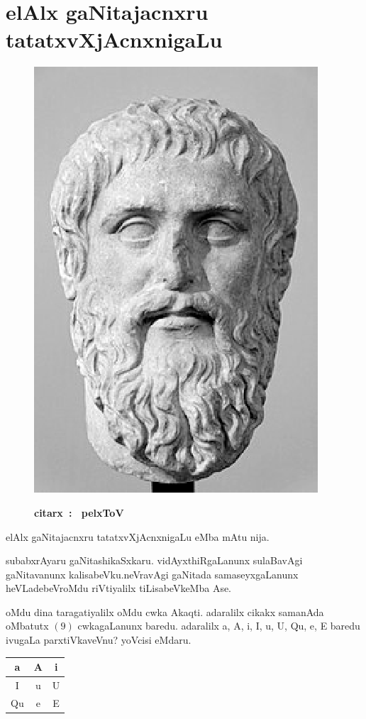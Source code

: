 \chapter{elAlx gaNitajacnxru tatatxvXjAcnxnigaLu}

\begin{figure}
  \centering\includegraphics[scale=0.8]{src/figures/Plato.eps}
  
  {\bf  citarx~:~ pelxToV}
    \end{figure}
elAlx gaNitajacnxru tatatxvXjAcnxnigaLu eMba mAtu nija.

subabxrAyaru gaNitashikaSxkaru. vidAyxthiR\-gaLanunx sulaBavAgi gaNitavanunx kalisabeVku.\break neVravAgi gaNitada samaseyxgaLanunx heVLade\break beVroMdu riVtiyalilx tiLisabeVkeMba Ase.

oMdu dina taragatiyalilx oMdu cwka Akaqti. adaralilx cikakx samanAda oMbatutx $(9)$ cwkagaLanunx baredu. adaralilx a, A, i, I, u, U, Qu, e, E baredu ivugaLa parxtiVkaveVnu? yoVcisi eMdaru.
\begin{center}
\begin{tabular}{|c|c|c|}
\hline
a & A & i\\
\hline
I & u & U\\
\hline
Qu & e & E\\
\hline
\end{tabular}
\end{center}



